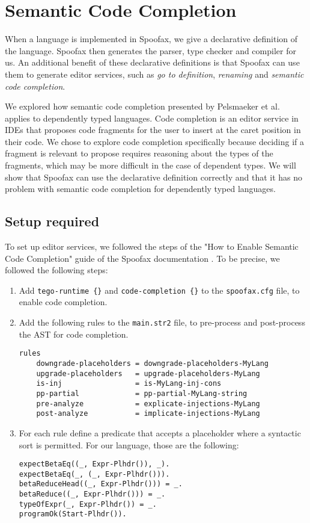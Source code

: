 \chapter{\label{chap:editor-services}Semantic Code Completion}

When a language is implemented in Spoofax, we give a declarative definition of the language. Spoofax then generates the parser, type checker and compiler for us. An additional benefit of these declarative definitions is that Spoofax can use them to generate editor services, such as \emph{go to definition}, \emph{renaming} and \emph{semantic code completion}. 

We explored how semantic code completion presented by Pelsmaeker et al.~\cite{codecompletion} applies to dependently typed languages. Code completion is an editor service in IDEs that proposes code fragments for the user to insert at the caret position in their code. We chose to explore code completion specifically because deciding if a fragment is relevant to propose requires reasoning about the types of the fragments, which may be more difficult in the case of dependent types. We will show that Spoofax can use the declarative definition correctly and that it has no problem with semantic code completion for dependently typed languages.

\section{Setup required}
To set up editor services, we followed the steps of the "How to Enable Semantic Code Completion" guide of the Spoofax documentation \cite{semcomplet}. To be precise, we followed the following steps:
\begin{enumerate}
	\item Add \verb|tego-runtime {}| and \verb|code-completion {}| to the \verb|spoofax.cfg| file, to enable code completion.
	\item Add the following rules to the \verb|main.str2| file, to pre-process and post-process the AST for code completion.
	\begin{lstlisting}
rules
	downgrade-placeholders = downgrade-placeholders-MyLang
	upgrade-placeholders   = upgrade-placeholders-MyLang
	is-inj                 = is-MyLang-inj-cons
	pp-partial             = pp-partial-MyLang-string
	pre-analyze            = explicate-injections-MyLang
	post-analyze           = implicate-injections-MyLang
	\end{lstlisting}
	\item For each rule define a predicate that accepts a placeholder where a syntactic sort is permitted. For our language, those are the following:
	\begin{lstlisting}
expectBetaEq((_, Expr-Plhdr()), _).
expectBetaEq(_, (_, Expr-Plhdr())).
betaReduceHead((_, Expr-Plhdr())) = _.
betaReduce((_, Expr-Plhdr())) = _.
typeOfExpr(_, Expr-Plhdr()) = _.
programOk(Start-Plhdr()).
	\end{lstlisting}
	
\end{enumerate}

